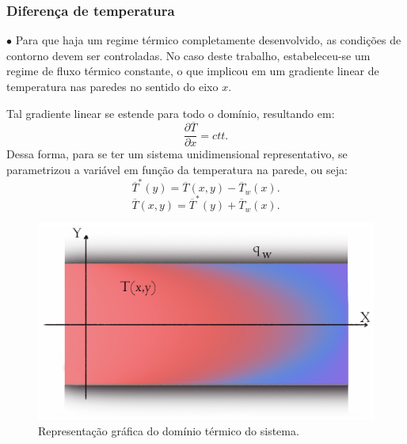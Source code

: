 \documentclass[xcolor=dvipsnames,10pt,aspectratio=169]{beamer}
\begin{document}
		\begin{frame}
			\frametitle{Diferença de temperatura}
			$\bullet$ Para que haja um regime térmico completamente desenvolvido, as condições de contorno devem ser controladas. No caso deste trabalho, estabeleceu-se um regime de fluxo térmico constante, o que implicou em um gradiente linear de temperatura nas paredes no sentido do eixo $x$.  \\
			\begin{minipage}[h!]{0.36\textwidth}
				Tal gradiente linear se estende para todo o domínio, resultando em:
				\begin{equation}
				\frac{\partial \overline{T}}{\partial x} = ctt.
				\end{equation}
				Dessa forma, para se ter um sistema unidimensional representativo, se parametrizou a variável em função da temperatura na parede, ou seja:
				\begin{equation}
				\overline{T}^\ast(y) = \overline{T}(x,y)  - \overline{T}_w(x) .
				\end{equation}
				\begin{equation}
				\overline{T}(x,y) = \overline{T}^\ast(y) + \overline{T}_w(x).
				\end{equation}
			\end{minipage}\hfill
			\begin{minipage}[h!]{0.60\textwidth}
			\begin{figure}
				\centering
				\includegraphics[angle=0, scale=0.14]{imagemtermico}
				\caption{Representação gráfica do domínio térmico do sistema.}
				\label{temperatura}
			\end{figure}
			\end{minipage}
		\end{frame}
		
		
		
\end{document}
